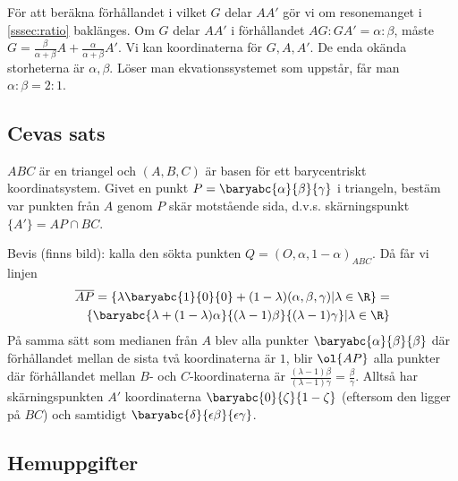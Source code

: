 För att beräkna förhållandet i vilket $G$ delar $AA'$ gör vi om resonemanget i
\ref{sssec:ratio} baklänges.
Om $G$ delar $AA'$ i förhållandet $AG : GA' = \alpha : \beta$, måste
$G = \frac{\beta}{\alpha+\beta} A + \frac{\alpha}{\alpha + \beta}A'$.
Vi kan koordinaterna för $G, A, A'$. De enda okända storheterna är $\alpha, \beta$.
Löser man ekvationssystemet som uppstår, får man $\alpha : \beta = 2 : 1$.

\subsection{Cevas sats}
$ABC$ är en triangel och $(A,B,C)$ är basen för ett barycentriskt koordinatsystem.
Givet en punkt $P=\baryabc{\alpha}{\beta}{\gamma}$
i triangeln, bestäm var punkten från $A$ genom $P$ skär motstående sida, 
d.v.s. skärningspunkt $\{A'\} = AP \cap BC$.

Bevis (finns bild): kalla den sökta punkten $Q = (O, \alpha, 1-\alpha)_{ABC}$. Då får vi linjen 
\begin{eqnarray*}
\overline{AP} = \{\lambda \baryabc{1}{0}{0} + (1 - \lambda)(\alpha, \beta, \gamma) | \lambda \in \R\}  = \\
\{
    \baryabc{\lambda + (1-\lambda)\alpha} {(\lambda-1)\beta} {(\lambda-1)\gamma} | \lambda \in \R
\}
\end{eqnarray*}
På samma sätt som medianen från $A$ blev alla punkter $\baryabc{\alpha}{\beta}{\beta}$
där förhållandet mellan de sista två koordinaterna är $1$, blir 
$\ol{AP}$ alla punkter där förhållandet mellan $B$- och $C$-koordinaterna är
$\frac{(\lambda-1)\beta} {(\lambda-1)\gamma} = \frac{\beta}{\gamma}$.
Alltså har skärningspunkten $A'$ koordinaterna 
$\baryabc{0}{\zeta}{1 - \zeta}$ (eftersom den ligger på $BC$) och samtidigt
$\baryabc{\delta} {\epsilon\beta} {\epsilon\gamma}$.
{}







\subsection{Hemuppgifter}


